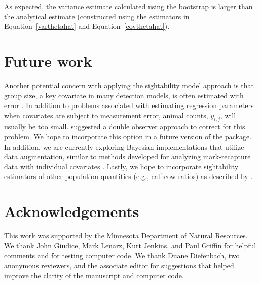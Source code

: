 \documentclass[nojss]{jss}
\begin{document}
As expected, the variance estimate calculated using the bootstrap is
larger than the analytical estimate (constructed using  the
estimators in Equation~\ref{varthetahat} and
Equation~\ref{covthetahat}).

\section{Future work}
Another potential concern with applying the sightability model
approach is that group size,  a key covariate in many detection
models, is often estimated with error
 \citep{CoganDief1998,Walsh2009}. In addition to problems associated with estimating regression parameters when covariates are subject to measurement error,
  animal counts, $y_{i,j}$, will usually be too small.
  \citet{Walsh2009} suggested a double observer approach to correct for this problem.  We hope to incorporate this option in a future version of the 
  package.  In addition, we are currently exploring Bayesian implementations
  that utilize data augmentation, similar to methods developed for
  analyzing mark-recapture data with individual covariates
  \citep{Royle,RoyleDorazio}.  Lastly, we hope to incorporate
 sightability estimators of other population quantities (e.g.,
 calf:cow ratios) as described by \citet{samuel1992}.


\section*{Acknowledgements}
This work was supported by the Minnesota Department of Natural
Resources.  We thank John Giudice, Mark Lenarz, Kurt Jenkins, and
Paul Griffin for helpful comments and for testing computer code.  We
thank Duane Diefenbach, two anonymous reviewers, and the associate
editor for suggestions that helped improve the clarity of the
manuscript and computer code.



\end{document}
